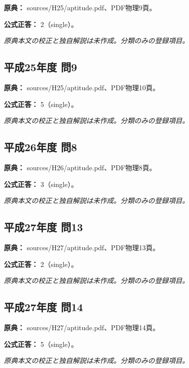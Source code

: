 \noindent\textbf{原典：} sources/H25/aptitude.pdf、PDF物理9頁。

\textbf{公式正答：} 2（single）。

\par\textit{原典本文の校正と独自解説は未作成。分類のみの登録項目。}

\subsection{平成25年度 問9}
\label{q:h25-reg-apt-09}

\noindent\textbf{原典：} sources/H25/aptitude.pdf、PDF物理10頁。

\textbf{公式正答：} 5（single）。

\par\textit{原典本文の校正と独自解説は未作成。分類のみの登録項目。}

\subsection{平成26年度 問8}
\label{q:h26-reg-apt-08}

\noindent\textbf{原典：} sources/H26/aptitude.pdf、PDF物理8頁。

\textbf{公式正答：} 3（single）。

\par\textit{原典本文の校正と独自解説は未作成。分類のみの登録項目。}

\subsection{平成27年度 問13}
\label{q:h27-reg-apt-13}

\noindent\textbf{原典：} sources/H27/aptitude.pdf、PDF物理13頁。

\textbf{公式正答：} 2（single）。

\par\textit{原典本文の校正と独自解説は未作成。分類のみの登録項目。}

\subsection{平成27年度 問14}
\label{q:h27-reg-apt-14}

\noindent\textbf{原典：} sources/H27/aptitude.pdf、PDF物理14頁。

\textbf{公式正答：} 5（single）。

\par\textit{原典本文の校正と独自解説は未作成。分類のみの登録項目。}

